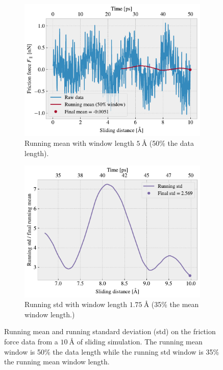\begin{figure}[H]
  \centering
  \begin{subfigure}[t]{0.49\textwidth}
    \centering
    \includegraphics[width=\textwidth]{figures/baseline/Ff_runmean.pdf}
    \caption{Running mean with window length $\SI{5}{\text{Å}}$ (50\% the data length).}
    \label{fig:runmean}
  \end{subfigure}
  \hfill
  \begin{subfigure}[t]{0.49\textwidth}
      \centering
      \includegraphics[width=\textwidth]{figures/baseline/Ff_runstd.pdf}
      \caption{Running std with window length $\SI{1.75}{\text{Å}}$ (35\% the mean window length.)}
      \label{fig:runstd}
  \end{subfigure}
  \caption{Running mean and running standard deviation (std) on the friction force data from a $\SI{10}{{\text{Å}}}$ of sliding simulation. The running mean window is 50\% the data length while the running std window is 35\% the running mean window length.}
  \label{fig:running}
\end{figure}


